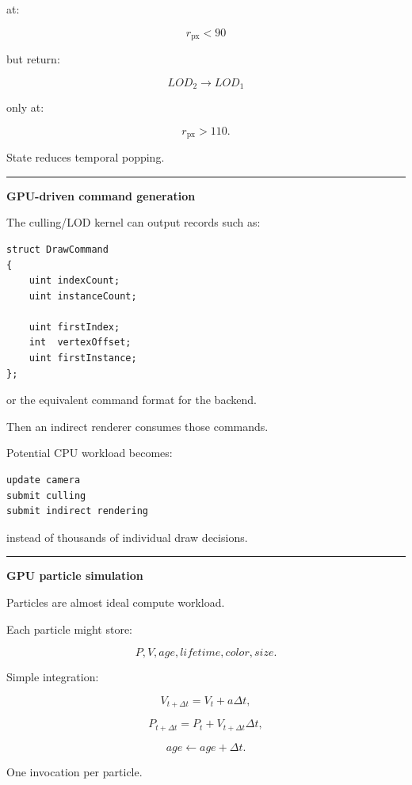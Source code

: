 at:

\[
r_{\text{px}}<90
\]

but return:

\[
LOD_2\rightarrow LOD_1
\]

only at:

\[
r_{\text{px}}>110.
\]

State reduces temporal popping.

\begin{center}\rule{0.5\linewidth}{0.5pt}\end{center}

\textbf{GPU-driven command generation}

The culling/LOD kernel can output records such as:

\protect{}\label{p10-draw-command}%
\begin{verbatim}
struct DrawCommand
{
    uint indexCount;
    uint instanceCount;

    uint firstIndex;
    int  vertexOffset;
    uint firstInstance;
};
\end{verbatim}

or the equivalent command format for the backend.

Then an indirect renderer consumes those commands.

Potential CPU workload becomes:

\protect{}\label{p10-cpu-small}%
\begin{verbatim}
update camera
submit culling
submit indirect rendering
\end{verbatim}

instead of thousands of individual draw decisions.

\begin{center}\rule{0.5\linewidth}{0.5pt}\end{center}

\textbf{GPU particle simulation}

Particles are almost ideal compute workload.

Each particle might store:

\[
P,
V,
age,
lifetime,
color,
size.
\]

Simple integration:

\[
V_{t+\Delta t}
=
V_t+
a\Delta t,
\]

\[
P_{t+\Delta t}
=
P_t+
V_{t+\Delta t}\Delta t,
\]

\[
age\leftarrow age+\Delta t.
\]

One invocation per particle.

